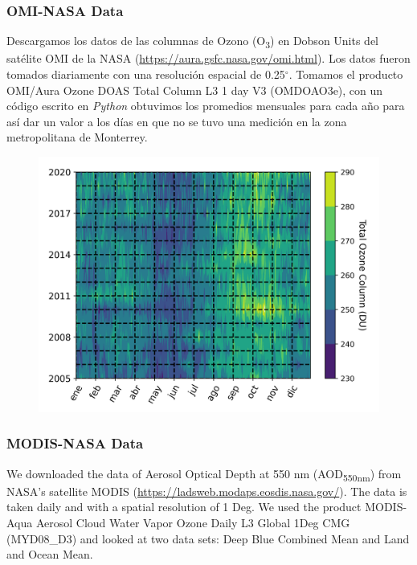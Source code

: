 \subsubsection{OMI-NASA Data}
Descargamos los datos de las columnas de Ozono (O\textsubscript{3}) en Dobson Units del satélite OMI de la NASA 
(\url{https://aura.gsfc.nasa.gov/omi.html}). Los datos fueron tomados diariamente con una resolución espacial de 0.25$^{\circ}$.
Tomamos el producto OMI/Aura Ozone DOAS Total Column L3 1 day V3 (OMDOAO3e), con un código escrito en \textit{Python} obtuvimos
los promedios mensuales para cada año para así dar un valor a los días en que no se tuvo una medición en la zona metropolitana de Monterrey.
\begin{figure}[H]
    \centering
    \includegraphics[scale=0.5]{images/Ozono_Daily.png}
    \caption{}
    \label{fig:ozono_daily}
\end{figure}
\subsubsection{MODIS-NASA Data}
We downloaded the data of Aerosol Optical Depth at 550 nm (AOD\textsubscript{550nm}) from NASA’s
satellite MODIS (\url{https://ladsweb.modaps.eosdis.nasa.gov/}). The data is taken daily and with a spatial
resolution of 1 Deg. We used the product MODIS-Aqua Aerosol Cloud Water Vapor Ozone Daily L3 Global 1Deg CMG
(MYD08\_D3) and looked at two data sets: Deep Blue Combined Mean and Land and Ocean Mean. 
